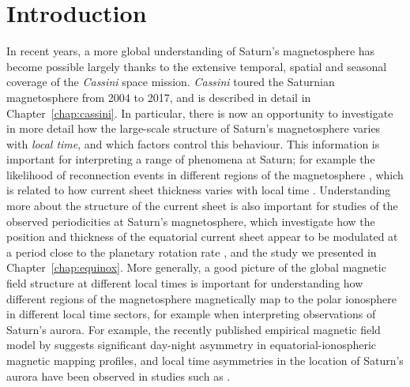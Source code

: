 \section{Introduction}\label{LTsectors:sec:intro}
In recent years, a more global understanding of Saturn's magnetosphere has become possible largely thanks to the extensive temporal, spatial and seasonal coverage of the \textit{Cassini} space mission. \textit{Cassini} toured the Saturnian magnetosphere from 2004 to 2017, and is described in detail in Chapter~\ref{chap:cassini}. In particular, there is now an opportunity to investigate in more detail how the large-scale structure of Saturn's magnetosphere varies with \textit{local time}, and which factors control this behaviour. This information is important for interpreting a range of phenomena at Saturn; for example the likelihood of reconnection events in different regions of the magnetosphere \citep{delamere2015}, which is related to how current sheet thickness varies with local time \citep{kellett2011}. Understanding more about the structure of the current sheet is also important for studies of the observed periodicities at Saturn's magnetosphere, which investigate how the position and thickness of the equatorial current sheet appear to be modulated at a period close to the planetary rotation rate \citep[e.g.][]{cowley2017b}, and the study we presented in Chapter~\ref{chap:equinox}. More generally, a good picture of the global magnetic field structure at different local times is important for understanding how different regions of the magnetosphere magnetically map to the polar ionosphere in different local time sectors, for example when interpreting observations of Saturn's aurora. For example, the recently published empirical magnetic field model by \citet{carbary2018} suggests significant day-night asymmetry in equatorial-ionospheric magnetic mapping profiles, and local time asymmetries in the location of Saturn's aurora have been observed in studies such as \citet{badman2006,badman2011}.


